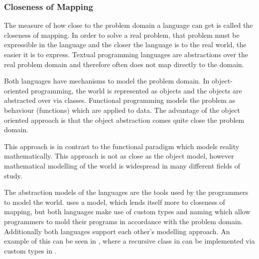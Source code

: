 \subsubsection{Closeness of Mapping}
The measure of how close to the problem domain a language can get is called the closeness of mapping. In order to solve a real problem, that problem must be expressible in the language and the closer the language is to the real world, the easier it is to express\cite{green1996usability}. Textual programming languages are abstractions over the real problem domain and therefore often does not map directly to the domain.

Both languages have mechanisms to model the problem domain. In object-oriented programming, the world is represented as objects and the objects are abstracted over via classes\cite{kindler2011object}. Functional programming models the problem as behaviour (functions) which are applied to data\cite{hughes1989functional}. The advantage of the object oriented approach is that the object abstraction comes quite close the problem domain.


This approach is in contrast to the functional paradigm which models reality mathematically. This approach is not as close as the object model, however mathematical modelling of the world is widespread in many different fields of study.


The abstraction models of the languages are the tools used by the programmers to model the world. \cs uses a model, which lends itself more to closeness of mapping, but both languages make use of custom types and naming which allow programmers to mold their programs in accordance with the problem domain. Additionally both languages support each other's modelling approach. An example of this can be seen in , where a recursive class in \cs can be implemented via custom types in \fs.


